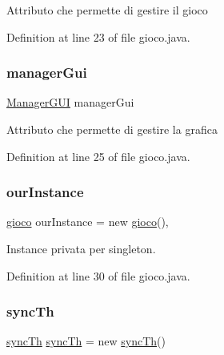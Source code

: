 Attributo che permette di gestire il gioco 

Definition at line 23 of file gioco.\+java.

\mbox{\label{class_snake_1_1game_1_1gioco_a2d4e303de68f727259c79a2d5f09f85d}} 
\subsubsection{\texorpdfstring{manager\+Gui}{managerGui}}
{\footnotesize\ttfamily \mbox{\hyperlink{class_snake_1_1gui_1_1_manager_g_u_i}{Manager\+G\+UI}} manager\+Gui\hspace{0.3cm}{\ttfamily [private]}}

Attributo che permette di gestire la grafica 

Definition at line 25 of file gioco.\+java.

\mbox{\label{class_snake_1_1game_1_1gioco_a1bd69ae0618ecbc11419d8d59446cf91}} 
\subsubsection{\texorpdfstring{our\+Instance}{ourInstance}}
{\footnotesize\ttfamily \mbox{\hyperlink{class_snake_1_1game_1_1gioco}{gioco}} our\+Instance = new \mbox{\hyperlink{class_snake_1_1game_1_1gioco}{gioco}}()\hspace{0.3cm}{\ttfamily [static]}, {\ttfamily [private]}}



Instance privata per singleton. 



Definition at line 30 of file gioco.\+java.

\mbox{\label{class_snake_1_1game_1_1gioco_ad1fc0de73f9b73491818970993ce6ea7}} 
\subsubsection{\texorpdfstring{sync\+Th}{syncTh}}
{\footnotesize\ttfamily \mbox{\hyperlink{class_snake_1_1game_1_1utility_1_1sync_th}{sync\+Th}} \mbox{\hyperlink{class_snake_1_1game_1_1utility_1_1sync_th}{sync\+Th}} = new \mbox{\hyperlink{class_snake_1_1game_1_1utility_1_1sync_th}{sync\+Th}}()\hspace{0.3cm}{\ttfamily [private]}}

